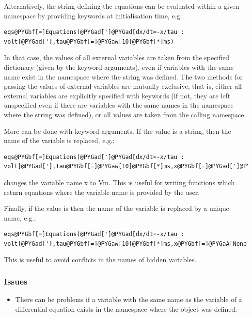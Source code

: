 \documentclass[letterpaper,10pt,english]{manual}
\begin{document}
Alternatively, the string defining the equations can be evaluated within a given namespace
by providing keywords at initialisation time, e.g.:

\begin{Verbatim}[commandchars=@\[\]]
eqs@PYGbf[=]Equations(@PYGad[']@PYGad[dx/dt=-x/tau : volt]@PYGad['],tau@PYGbf[=]@PYGaw[10]@PYGbf[*]ms)
\end{Verbatim}

In that case, the values of all external variables are taken from the specified
dictionary (given by the keyword arguments), even if variables with the same name
exist in the namespace where the string was defined. The two methods for passing the
values of external variables are mutually exclusive, that is, either all external variables
are explicitly specified with keywords (if not, they are left unspecified even if there
are variables with the same names in the namespace where the string was defined), or all
values are taken from the calling namespace.

More can be done with keyword arguments. If the value is a string, then the name of the
variable is replaced, e.g.:

\begin{Verbatim}[commandchars=@\[\]]
eqs@PYGbf[=]Equations(@PYGad[']@PYGad[dx/dt=-x/tau : volt]@PYGad['],tau@PYGbf[=]@PYGaw[10]@PYGbf[*]ms,x@PYGbf[=]@PYGad[']@PYGad[Vm]@PYGad['])
\end{Verbatim}

changes the variable name x to Vm. This is useful for writing functions which return
equations where the variable name is provided by the user.

Finally, if the value is  then the name of the variable is replaced by a unique
name, e.g.:

\begin{Verbatim}[commandchars=@\[\]]
eqs@PYGbf[=]Equations(@PYGad[']@PYGad[dx/dt=-x/tau : volt]@PYGad['],tau@PYGbf[=]@PYGaw[10]@PYGbf[*]ms,x@PYGbf[=]@PYGaA[None])
\end{Verbatim}

This is useful to avoid conflicts in the names of hidden variables.


\subsubsection{Issues}
\begin{itemize}
\item {} 
There can be problems if a variable with the same name as the variable of a
differential equation exists in the namespace where the \hyperlink{brian.Equations}{} object was defined.

\end{itemize}
\end{document}
